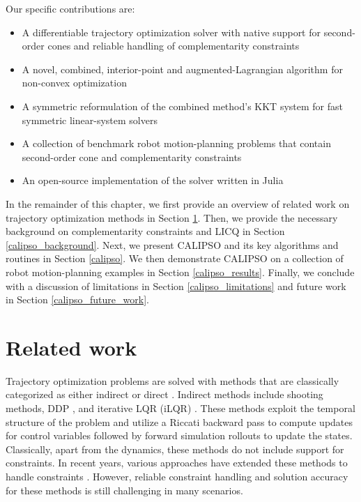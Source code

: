 Our specific contributions are:
\begin{itemize} 
	\item A differentiable trajectory optimization solver with native support for second-order cones and reliable handling of complementarity constraints
	\item A novel, combined, interior-point and augmented-Lagrangian algorithm for non-convex optimization
	\item A symmetric reformulation of the combined method's KKT system for fast symmetric linear-system solvers
	\item A collection of benchmark robot motion-planning problems that contain second-order cone and complementarity constraints
	\item An open-source implementation of the solver written in Julia
\end{itemize}

In the remainder of this chapter, we first provide an overview of related work on trajectory optimization methods in Section \ref{calipso_related_work}. Then, we provide the necessary background on complementarity constraints and LICQ in Section \ref{calipso_background}. Next, we present CALIPSO and its key algorithms and routines in Section \ref{calipso}. We then demonstrate CALIPSO on a collection of robot motion-planning examples in Section \ref{calipso_results}. Finally, we conclude with a discussion of limitations in Section \ref{calipso_limitations} and future work in Section \ref{calipso_future_work}.

\section{Related work} \label{calipso_related_work}

Trajectory optimization problems are solved with methods that are classically categorized as either indirect or direct \cite{betts1998survey}. Indirect methods include shooting methods, DDP \cite{jacobson1970differential}, and iterative LQR (iLQR) \cite{li2004iterative}. These methods exploit the temporal structure of the problem and utilize a Riccati backward pass to compute updates for control variables followed by forward simulation rollouts to update the states. Classically, apart from the dynamics, these methods do not include support for constraints. In recent years, various approaches have extended these methods to handle constraints \cite{tassa2014control,howell2019altro, howell2022trajectory,mastalli2020crocoddyl,singh2022optimizing,jallet2022constrained,jackson2021altro}. However, reliable constraint handling and solution accuracy for these methods is still challenging in many scenarios.


